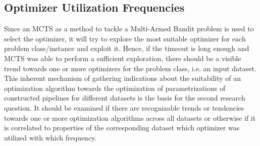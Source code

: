 \subsection{Optimizer Utilization Frequencies}
\label{sec:evaluation:analysis:optimizer}
Since an MCTS as a method to tackle a Multi-Armed Bandit problem is used to select the optimizer, it will try to explore the most suitable optimizer for each problem class/instance and exploit it.
Hence, if the timeout is long enough and MCTS was able to perform a sufficient exploration, there should be a visible trend towards one or more optimizers for the problem class, i.e. an input dataset.\newline
This inherent mechanism of gathering indications about the suitability of an optimization algorithm towards the optimization of parametrizations of constructed pipelines for different datasets is the basis for the second research question.\newline
It should be examined if there are recognizable trends or tendencies towards one or more optimization algorithms across all datasets or otherwise if it is correlated to properties of the corresponding dataset which optimizer was utilized with which frequency.

